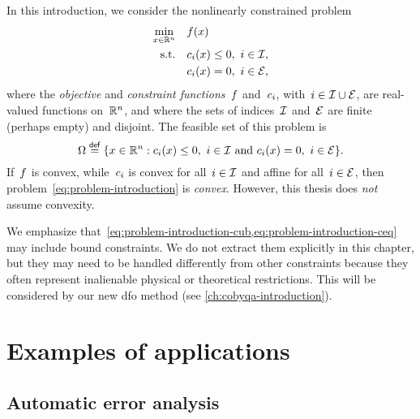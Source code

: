 In this introduction, we consider the nonlinearly constrained problem
\begin{subequations}
    \label{eq:problem-introduction}
    \begin{align}
        \min_{\iter \in \R^n}   & \quad \obj(\iter)\\
        \text{s.t.}             & \quad \con{i}(\iter) \le 0, ~ i \in \iub, \label{eq:problem-introduction-cub}\\
                                & \quad \con{i}(\iter) = 0, ~ i \in \ieq, \label{eq:problem-introduction-ceq}
    \end{align}
\end{subequations}
%
%
%
%
where the \emph{objective} and \emph{constraint functions}~$f$ and~$c_{i}$, with~$i \in \mathcal{I} \cup \mathcal{E}$, are real-valued functions on~$\mathbb{R}^n$, and where the sets of indices~$\mathcal{I}$ and~$\mathcal{E}$ are finite (perhaps empty) and disjoint.
The feasible set of this problem is
\begin{equation*}
    \fset \eqdef \set{\iter \in \R^n : \text{$\con{i}(\iter) \le 0, ~ i \in \iub$ and~$\con{i}(\iter) = 0, ~ i \in \ieq$}}.
\end{equation*}
If~$f$ is convex, while~$c_{i}$ is convex for all~$i \in \mathcal{I}$ and affine for all~$i \in \mathcal{E}$, then problem~\cref{eq:problem-introduction} is \emph{convex}.
However, this thesis does \emph{not} assume convexity.

We emphasize that~\cref{eq:problem-introduction-cub,eq:problem-introduction-ceq} may include bound constraints.
We do not extract them explicitly in this chapter, but they may need to be handled differently from other constraints because they often represent inalienable physical or theoretical restrictions.
This will be considered by our new \gls{dfo} method (see \cref{ch:cobyqa-introduction}).

\section{Examples of applications}
\label{sec:dfo-examples}

\subsection{Automatic error analysis}

